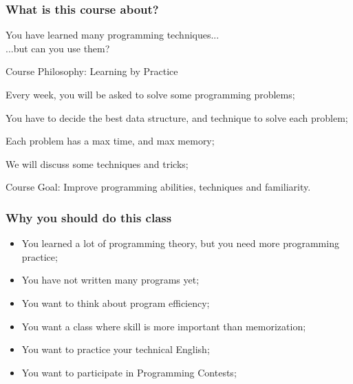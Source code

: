 \documentclass{beamer}
\begin{document}
\begin{frame}
  \frametitle{What is this course about?}
  
  You have learned many programming techniques...\\\hfill ...but can you use them?

  \begin{block}{Course Philosophy: Learning by Practice}
    \begin{itemize}
      {\small
    \item Every week, you will be asked to solve some programming
      problems;
    \item You have to decide the best data structure, and technique to
      solve each problem;
    \item Each problem has a max time, and max memory;
    \item We will discuss some techniques and tricks;
      }
    \end{itemize}
  \end{block}

  \begin{exampleblock}{Course Goal:}
    Improve programming abilities, techniques and familiarity.
  \end{exampleblock}
\end{frame}

\begin{frame}
  \frametitle{Why you should do this class}
  \begin{itemize}
  \item You learned a lot of programming theory, but you need more
    programming practice;
    
    \smallskip

  \item You have not written many programs yet;

    \smallskip

  \item You want to think about program efficiency;

    \smallskip

  \item You want a class where skill is more important than memorization;

    \smallskip

  \item You want to practice your technical English;

    \smallskip

  \item You want to participate in Programming Contests;
  \end{itemize}
\end{frame}
\end{document}
